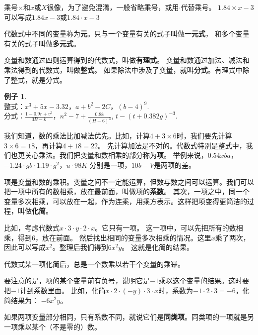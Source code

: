 \documentclass[12pt,UTF8]{ctexbook}
\theoremstyle{definition}
\newtheorem{ex}{例子}[section]
\theoremstyle{plain}
\begin{document}
乘号$\times$和$x$或$X$很像，为了避免混淆，一般省略乘号，或用$\cdot$代替乘号。
$1.84\times x - 3$可以写成$1.84 x - 3$或$1.84\cdot x - 3$

代数式中不同的变量称为\textbf{元}。只与一个变量有关的式子叫做\textbf{一元式}，
和多个变量有关的式子叫做\textbf{多元式}。

变量和数通过四则运算得到的代数式，叫做\textbf{有理式}。
变量和数通过加法、减法和乘法得到的代数式，叫做\textbf{整式}。
如果除法中涉及了变量，就叫\textbf{分式}。有理式中除了整式，就是分式。
\begin{ex}\label{ex:1-1-0}
    \mbox{} \\
    \indent 整式：$x^3 + 5x - 3.32$，$a + b^2 - 2C$，$(b - 4)^9.$ \\
    \indent 分式：$\frac{1 - 0.9r + v^2}{3B - k}$，$n^2 - 7 + \frac{0.88}{(H - 6)^3}$, $t - (t + 0.382g)^{-3}.$\\
\end{ex}

我们知道，数的乘法比加减法优先。比如，计算$4 + 3\times 6$时，我们要先计算$3\times 6 = 18$，再计算$4 + 18 = 22$。
先计算加法是不对的。代数式特别是整式中，我们也更关心乘法。我们把变量和数相乘的部分称为\textbf{项}。
举例来说，$0.54xba$，$-1.24\cdot gb\cdot 1.19 \cdot g^2$，$u\cdot 98K$
分别是一项，$10b - V$是两项的差。

项是变量和数的乘积。变量之间不一定能运算，但数与数之间可以运算。我们可以把一项中所有的数相乘，放在最前面，叫做项的\textbf{系数}。
其次，一项之中，同一个变量多次相乘，可以放在一起，作为连乘，用乘方表示。这样把项变得更简洁的过程，叫做\textbf{化简}。

比如，考虑代数式$x\cdot 3\cdot y \cdot 2\cdot x $。它只有一项。
这一项中，可以先把所有的数相乘，得到$6$，放在前面。
然后找出相同的变量多次相乘的情况。这里$x$乘了两次，因此可以写成$x^2$。整理后我们得到$6x^2y$。
这就是化简的结果。

代数式某一项化简后，总是一个数乘以若干个变量的乘幂。

要注意的是，项的某个变量前有负号，说明它是$-1$乘以这个变量的结果。这时要把$-1$计到系数里面。
比如，化简$x\cdot 2 \cdot (-y)\cdot 3\cdot x$时，系数为$-1\cdot 2\cdot 3=-6$，化简结果为：
$-6x^2y$。

如果两项变量部分相同，只有系数不同，就说它们是\textbf{同类项}。同类项的一项就是另一项乘以某个（不是零的）数。
\end{document}
